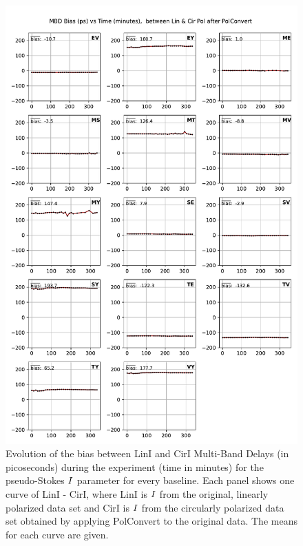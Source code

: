 \documentclass[letterpaper,twoside,12pt]{article}
\begin{document}
\begin{figure}[ht!]
  \begin{center}
  \includegraphics[width=33pc]{MBD_bias_between_Lin_I_and_Cir_I.pdf}
  \caption{\small Evolution of the bias between LinI and CirI Multi-Band Delays (in picoseconds) during the experiment (time in minutes) for the pseudo-Stokes $\protect I$ parameter for every baseline. Each panel shows one curve of LinI - CirI, where LinI is $\protect I$ from the original, linearly polarized data set and CirI is $\protect I$ from the circularly polarized data set obtained by applying PolConvert to the original data. The means for each curve are given.}
  \label{mbd_lin_cir_bias}
  \end{center}
\end{figure}
\end{document}
